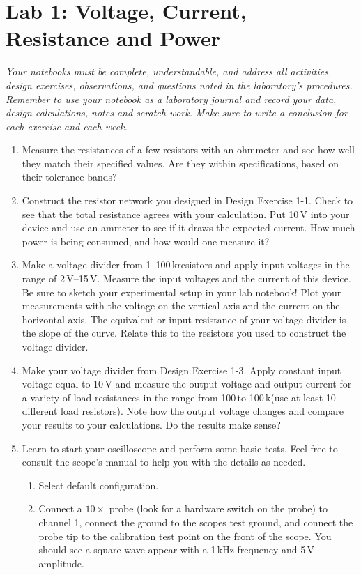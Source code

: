 \documentclass{article}
\begin{document}
\section{Lab 1: Voltage, Current, Resistance and Power}

\emph{Your notebooks must be complete, understandable, and address all activities, design exercises, observations, and questions noted in the laboratory's procedures. Remember to use your notebook as a laboratory journal and record your data, design calculations, notes and scratch work. Make sure to write a conclusion for each exercise and each week.} 

\begin{enumerate}
\item Measure the resistances of a few resistors with an ohmmeter and see how well they match their specified values. Are they within specifications, based on their tolerance bands?
\item Construct the resistor network you designed in Design Exercise 1-1. Check to see that the total resistance agrees with your calculation. Put 10\,V into your device and use an ammeter to see if it draws the expected current. How much power is being consumed, and how would one measure it?
\item Make a voltage divider from 1--100\,k\Ohm resistors and apply input voltages in the range of 2\,V--15\,V. Measure the input voltages and the current of this device. Be sure to sketch your experimental setup in your lab notebook! Plot your measurements with the voltage on the vertical axis and the current on the horizontal axis. The equivalent or input resistance of your voltage divider is the slope of the curve. Relate this to the resistors you used to construct the voltage divider.
\item Make your voltage divider from Design Exercise 1-3. Apply constant input voltage equal to 10\,V and measure the output voltage and output current for a variety of load resistances in the range from 100\,\Ohm to 100\,k\Ohm (use at least 10 different load resistors). Note how the output voltage changes and compare your results to your calculations. Do the results make sense?
\item Learn to start your oscilloscope and perform some basic tests. Feel free to consult the scope's manual to help you with the details as needed.
\begin{enumerate}
\item Select default configuration.
\item Connect a $10\times$ probe (look for a hardware switch on the probe) to channel 1, connect the ground to the scopes test ground, and connect the probe tip to the calibration test point on the front of the scope. You should see a square wave appear with a 1\,kHz frequency and 5\,V amplitude. 

\end{enumerate}
\end{enumerate}
\end{document}
